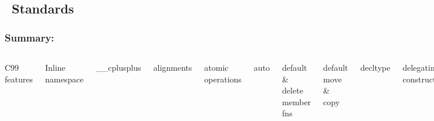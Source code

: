 \subsection{\CC\ Standards}
\begin{frame}[fragile,t]
\frametitle{Summary: }
\begin{columns}[t]

{\scriptsize
C99 features

Inline namespace

\_\_cplusplus

alignments

atomic operations

auto

default \& delete member fns

default move \& copy

decltype

delegating constructors

inherited constructors

override controls: final, override

explicit conversion operators

extended integer types

extern templates

lambdas

null pointer (nullptr)

rvalue references / move ops

}
{\scriptsize
attributes: {[[carries\_dependency]]}, [[noreturn]]

Dynamic Initialization/Destruction with Concurrency

Uniform initialization syntax and semantics

constant expressions (constexpr)

copying and rethrowing exceptions

enum class (scoped and strongly typed enums)

exception propagation (preventing it; noexcept)

in-class member initializers

initializer lists (uniform and general initialization)

local classes as template arguments

long long integers (at least 64 bits)

narrowing (how to prevent it)

static (compile-time) assertions (static\_assert)

}
\end{columns}
\end{frame}
